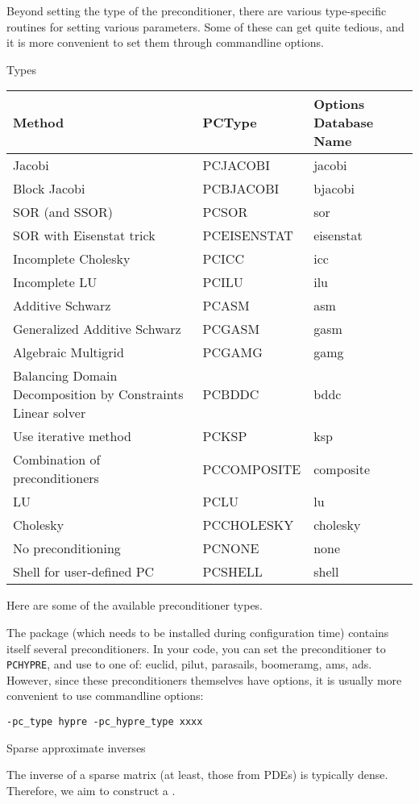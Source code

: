 Beyond setting the type of the preconditioner, there are various
type-specific routines for setting various parameters. Some of these
can get quite tedious, and it is more convenient to set them through
commandline options.

 {Types}

\begin{tabular}{|l|l|l|}
\toprule
Method&PCType&Options Database Name\\
\midrule
Jacobi&PCJACOBI&jacobi\\
Block Jacobi&PCBJACOBI&bjacobi\\
SOR (and SSOR)&PCSOR&sor\\
SOR with Eisenstat trick&PCEISENSTAT&eisenstat\\
Incomplete Cholesky&PCICC&icc\\
Incomplete LU&PCILU&ilu\\
Additive Schwarz&PCASM&asm\\
Generalized Additive Schwarz&PCGASM&gasm\\
Algebraic Multigrid&PCGAMG&gamg\\
Balancing Domain Decomposition by Constraints Linear solver&PCBDDC&bddc\\
Use iterative method&PCKSP&ksp\\
Combination of preconditioners&PCCOMPOSITE&composite\\
LU&PCLU&lu\\
Cholesky&PCCHOLESKY&cholesky\\
No preconditioning&PCNONE&none\\
Shell for user-defined PC&PCSHELL&shell  \\
\bottomrule
\end{tabular}

Here are some of the available preconditioner types.

The  package
(which needs to be installed during configuration time)
contains itself several preconditioners.
In your code, you can set the preconditioner to \lstinline{PCHYPRE},
and use  to one of:
euclid, pilut, parasails, boomeramg, ams, ads.
However, since these preconditioners themselves have options,
it is usually more convenient to use commandline options:
\begin{verbatim}
-pc_type hypre -pc_hypre_type xxxx
\end{verbatim}

 {Sparse approximate inverses}

The inverse of a sparse matrix (at least, those from \acp{PDE}) is typically dense.
Therefore, we aim to construct a .

